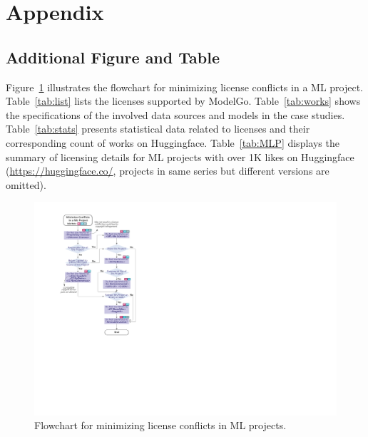 \section{Appendix}

\subsection{Additional Figure and Table}
\label{apdx:A}

Figure~\ref{fig:flowchart} illustrates the flowchart for minimizing license conflicts in a ML project.
Table~\ref{tab:list} lists the licenses supported by ModelGo.
Table~\ref{tab:works} shows the specifications of the involved data sources and models in the case studies.
Table~\ref{tab:stats} presents statistical data related to licenses and their corresponding count of works on Huggingface.
Table~\ref{tab:MLP} displays the summary of licensing details for ML projects with over 1K likes on Huggingface (\url{https://huggingface.co/}, projects in same series but different versions are omitted).

\begin{figure}[H]
  \centering
  \includegraphics[scale=1]{fig/flowchart.pdf}
  \caption{Flowchart for minimizing license conflicts in ML projects.}
  \Description{}
  \label{fig:flowchart}
\end{figure}

